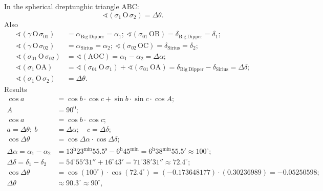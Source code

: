 \begin{description}
  In the spherical dreptunghic triangle ABC: %
  \[ \sphericalangle\left(\sigma_1\,\mathrm{O}\,\sigma_2\right)
     = \Delta\theta. \]
  Also
  \begin{align*}
  \sphericalangle\left(\gamma\,\mathrm{O}\,\sigma_{01}\right)
    &= \alpha_{\mathrm{Big\ Dipper}} = \alpha_1;\
  \sphericalangle\left(\sigma_{01}\,\mathrm{OB}\right)
    = \delta_{\mathrm{Big\ Dipper}} = \delta_1;\\
  \sphericalangle\left(\gamma\,\mathrm{O}\,\sigma_{02}\right)
    &= \alpha_{\mathrm{Sirius}} = \alpha_2;\
  \sphericalangle\left(\sigma_{02}\,\mathrm{OC}\right)
    = \delta_{\mathrm{Sirius}} = \delta_2;\\
  \sphericalangle\left(\sigma_{01}\,\mathrm{O}\,\sigma_{02}\right)
    &= \sphericalangle\left(\mathrm{AOC}\right)
    = \alpha_1 - \alpha_2 = \Delta\alpha;\\
  \sphericalangle\left(\sigma_1\,\mathrm{OA}\right)
    &= \sphericalangle\left(\sigma_{01}\,\mathrm{O}\,\sigma_1\right)
     + \sphericalangle\left(\sigma_{01}\,\mathrm{OA}\right)
    = \delta_{\mathrm{Big\ Dipper}} - \delta_{\mathrm{Sirius}}
    = \Delta\delta;\\
  \sphericalangle\left(\sigma_1\,\mathrm{O}\,\sigma_2\right)
    &= \Delta\theta.
  \end{align*}
  Results
  \begin{align*}
  \cos a &= \cos b\cdot\cos c + \sin b\cdot\sin c\cdot\cos A;\\
  A &= 90^{0};\\
  \cos a &= \cos b\cdot\cos c;\\
  a = \Delta\theta;\ b &= \Delta\alpha;\quad c = \Delta\delta;\\
  \cos\Delta\theta &= \cos\Delta\alpha\cdot\cos\Delta\delta;\\
  \Delta\alpha = \alpha_1 - \alpha_2
    &= 13^{\mathrm{h}}23^{\mathrm{min}}55.5^{\mathrm{s}}
     - 6^{\mathrm{h}}45^{\mathrm{min}}
     = 6^{\mathrm{h}}38^{\mathrm{min}}55.5' \approx 100^\circ;
  \\
  \Delta\delta = \delta_1 - \delta_2
    &= 54^\circ55'31'' + 16^\circ43' = 71^\circ38'31''
    \approx 72.4^\circ;\\
  \cos\Delta\theta &= \cos\left(100^\circ\right)
    \cdot\cos\left(72.4^\circ\right)
    = \left(-0.173648177\right)\cdot\left(0.30236989\right)
    = -0.05250598;\\
  \Delta\theta &\approx 90.3^\circ \approx 90^\circ,

\end{align*}
\end{description}
